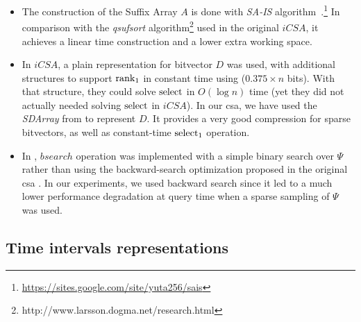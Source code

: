 	\begin{itemize}
		\item The construction of the Suffix Array $A$ is done with 
		{\em SA-IS} algorithm~\cite{nong2011two}.\footnote{\url{ https://sites.google.com/site/yuta256/sais}} 
		In comparison with the  {\em qsufsort} algorithm\footnote{
			http://www.larsson.dogma.net/research.html}
		\cite{Larsson:2007:FSS:1314704.1314853} used in the original $iCSA$, it achieves a linear time construction 
		and a lower extra working space. 
		
		\item In  $iCSA$, a plain representation for bitvector $D$ was used, with additional structures to support
		$\operatorname{rank}_1$ in constant time using ($0.375\times n$ bits). With that structure, they could solve $\operatorname{select}$ in $O(\log n)$ time (yet 
		they did not actually needed solving $\operatorname{select}$ in $iCSA$).
		In our \gls{csa}, we have used the {\em SDArray} from \cite{okanohara2007practical} to represent $D$. It provides a very 
		good compression for sparse bitvectors, as well as constant-time $\operatorname{select}_1$ operation.
		
		\item In \cite{FBNCPR12}, $bsearch$ operation was implemented with a simple binary search over $\Psi$ rather than
		using the backward-search optimization proposed in the original \gls{csa} \cite{Sad03}. In our experiments, we used
		backward search since it led to a much lower performance degradation at query time when a sparse sampling of $\Psi$ 
		was used.
		
	\end{itemize}

	\subsection{Time intervals representations}
	\label{sec:time_repr}

